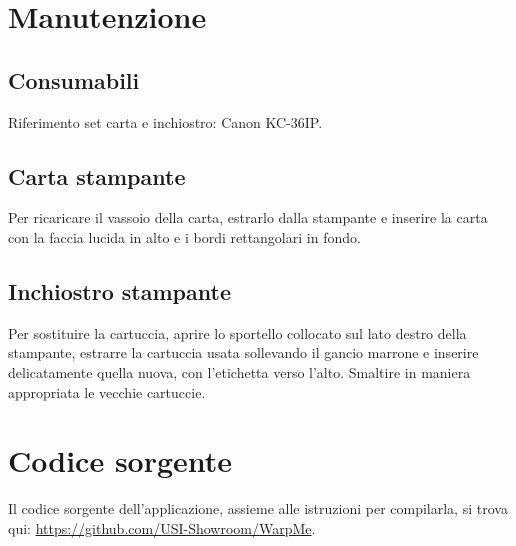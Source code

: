 \documentclass[12pt]{article}
\begin{document}
	
	
\section{Manutenzione}

	\subsection{Consumabili}
	
		Riferimento set carta e inchiostro: Canon KC-36IP.
		

	\subsection{Carta stampante}		
		
		Per ricaricare il vassoio della carta, estrarlo dalla stampante e inserire la carta con la faccia lucida in alto e i bordi rettangolari in fondo.
		
		
	\subsection{Inchiostro stampante}
		
		Per sostituire la cartuccia, aprire lo sportello collocato sul lato destro della stampante, estrarre la cartuccia usata sollevando il gancio marrone e inserire delicatamente quella nuova, con l'etichetta verso l'alto. Smaltire in maniera appropriata le vecchie cartuccie.
		
		
		
\section{Codice sorgente}

	Il codice sorgente dell'applicazione, assieme alle istruzioni per compilarla, si trova qui: \url{https://github.com/USI-Showroom/WarpMe}.
		
	
\end{document}
